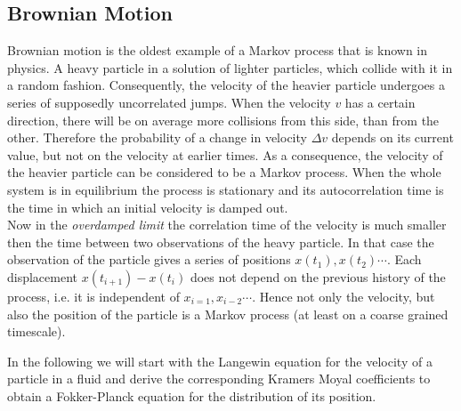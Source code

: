 \subsection{Brownian Motion}
\label{Brownian_Motion}
Brownian motion is the oldest example of a Markov process that is known in physics. A heavy particle in a solution of lighter particles, which collide with it in a random fashion. Consequently, the velocity of the heavier particle undergoes a series of supposedly uncorrelated jumps. When the velocity $v$ has a certain direction, there will be on average more collisions from this side, than from the other. Therefore the probability of a change in velocity $\Delta v$ depends on its current value, but not on the velocity at earlier times. As a consequence, the velocity of the heavier particle can be considered to be a Markov process. When the whole system is in equilibrium the process is stationary and its autocorrelation time is the time in which an initial velocity is damped out. \\
Now in the \textit{overdamped limit} the correlation time of the velocity is much smaller then the time between two observations of the heavy particle. In that case the observation of the particle gives a series of positions $x(t_1), x(t_2) \cdots$. Each displacement $x(t_{i+1}) - x(t_{i})$ does not depend on the previous history of the process, i.e. it is independent of $x_{i=1}, x_{i-2}\cdots$. Hence not only the velocity, but also the position of the particle is a Markov process (at least on a coarse grained timescale). 
\par
In the following we will start with the Langewin equation for the velocity of a particle in a fluid and derive the corresponding Kramers Moyal coefficients to obtain a Fokker-Planck equation for the distribution of its position. 

